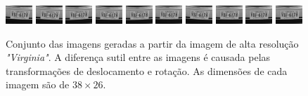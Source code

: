 \begin{figure}[H]
	\centering
	\caption{\label{fig:frames}
	Conjunto das imagens geradas a partir da imagem de alta resolução \emph{"Virginia"}. A diferença sutil entre as imagens é causada pelas transformações de deslocamento e rotação.
	As dimensões de cada imagem são de $38 \times 26$.}
	\includegraphics{figures/degradedImg/result-0.png}
	\includegraphics{figures/degradedImg/result-1.png}
	\includegraphics{figures/degradedImg/result-2.png}
	\includegraphics{figures/degradedImg/result-3.png}
	\includegraphics{figures/degradedImg/result-4.png}
	\includegraphics{figures/degradedImg/result-5.png}
	\includegraphics{figures/degradedImg/result-6.png}
	\includegraphics{figures/degradedImg/result-7.png}
	\includegraphics{figures/degradedImg/result-8.png}
	\includegraphics{figures/degradedImg/result-9.png} 


\end{figure}
